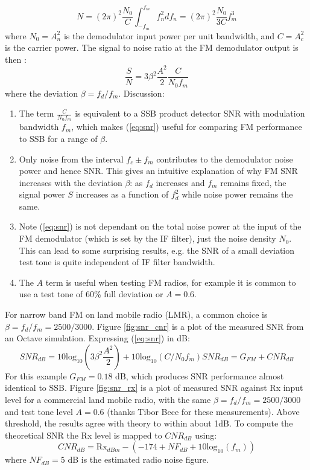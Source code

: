 \documentclass{article}
\begin{document}
\begin{equation}
N = (2\pi)^2 \frac{N_0}{C} \int_{-f_m}^{f_m} f_n^2 df_n = (2\pi)^2 \frac{N_0}{3C} f_m^3
\end{equation}
where $N_0=A_n^2$ is the demodulator input power per unit bandwidth, and $C=A_c^2$ is the carrier power.  The signal to noise ratio at the FM demodulator output is then \cite{crilly2009communication}:
\begin{equation}
\label{eq:snr}
\frac{S}{N} = 3 \beta^2 \frac{A^2}{2} \frac{C}{N_0 f_m}
\end{equation}
where the deviation $\beta=f_d/f_m$. Discussion:
\begin{enumerate}
\item The term $\frac{C}{N_0 f_m}$ is equivalent to a SSB product detector SNR with modulation bandwidth $f_m$, which makes (\ref{eq:snr}) useful for comparing FM performance to SSB for a range of $\beta$.
\item Only noise from the interval $f_c \pm f_m$ contributes to the demodulator noise power and hence SNR. This gives an intuitive explanation of why FM SNR increases with the deviation $\beta$: as $f_d$ increases and $f_m$ remains fixed, the signal power $S$ increases as a function of $f_d^2$ while noise power remains the same.
\item Note (\ref{eq:snr}) is not dependant on the total noise power at the input of the FM demodulator (which is set by the IF filter), just the noise density $N_0$.  This can lead to some surprising results, e.g. the SNR of a small deviation test tone is quite independent of IF filter bandwidth.
\item The $A$ term is useful when testing FM radios, for example it is common to use a test tone of 60\% full deviation or $A=0.6$.
\end{enumerate}

For narrow band FM on land mobile radio (LMR), a common choice is $\beta=f_d/f_m=2500/3000$.  Figure \ref{fig:snr_cnr} is a plot of the measured SNR from an Octave simulation. Expressing (\ref{eq:snr}) in dB:
\begin{equation}
SNR_{dB} = 10\mathrm{log_{10}}\left( 3 \beta^2 \frac{A^2}{2} \right) + 10\mathrm{log_{10}}(C/N_0f_m)
SNR_{dB} = G_{FM} + CNR_{dB}
\end{equation}
For this example $G_{FM}=0.18$ dB, which produces SNR performance almost identical to SSB. Figure \ref{fig:snr_rx} is a plot of measured SNR against Rx input level for a commercial land mobile radio, with the same $\beta=f_d/f_m=2500/3000$ and test tone level $A=0.6$ (thanks Tibor Bece for these measurements).  Above threshold, the results agree with theory to within about 1dB. To compute the theoretical SNR the Rx level is mapped to $CNR_{dB}$ using:
\begin{equation}
CNR_{dB} = \mathrm{Rx}_{dBm} - (-174 + NF_{dB} + 10\mathrm{log_{10}}(f_m)) 
\end{equation}
where $NF_{dB}=5$ dB is the estimated radio noise figure.
\end{document}
